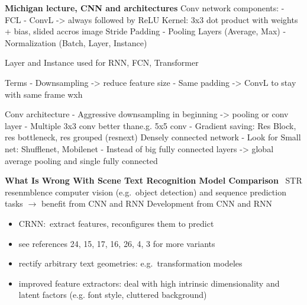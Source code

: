 \textbf{Michigan lecture, CNN and architectures}
Conv network components:
- FCL
- ConvL -> always followed by ReLU
    Kernel: 3x3 dot product with weights + bias, slided accros image
    Stride
    Padding
- Pooling Layers (Average, Max)
- Normalization (Batch, Layer, Instance)

Layer and Instance used for RNN, FCN, Transformer

Terms
- Downsampling -> reduce feature size
- Same padding -> ConvL to stay with same frame wxh

Conv architecture
- Aggressive downsampling in beginning -> pooling or conv layer
- Multiple 3x3 conv better thane.g. 5x5 conv
- Gradient saving:
     Res Block, res bottleneck, res grouped (resnext)
     Densely connected network
- Look for Small net: Shufflenet, Mobilenet
- Instead of big fully connected layers -> global average pooling and single fully connected

\textbf{What Is Wrong With Scene Text Recognition Model Comparison}~\cite{baek_what_2019}
\ac{STR} resenmblence computer vision (e.g.\ object detection) and sequence prediction
tasks $\rightarrow$ benefit from \ac{CNN} and \ac{RNN}
Development from \ac{CNN} and \ac{RNN}
\begin{itemize}
    \item CRNN:\ extract features, reconfigures them to predict
    \item see references 24, 15, 17, 16, 26, 4, 3 for more variants
    \item rectify arbitrary text geometries: e.g.\ transformation modeles
    \item improved feature extractors: deal with high intrinsic dimensionality and latent factors
        (e.g. font style, cluttered background)
\end{itemize}

